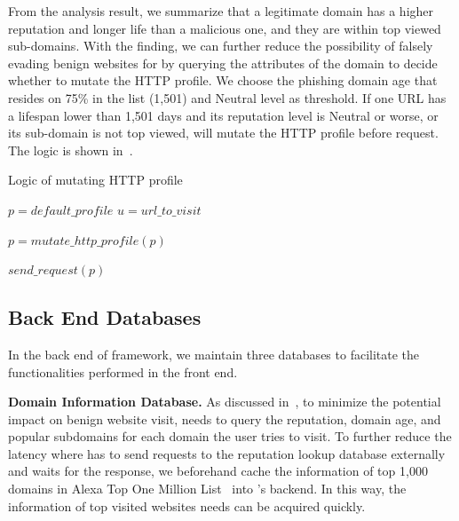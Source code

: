 From the analysis result, we summarize that a legitimate domain has a higher reputation and longer life than a malicious one, and they are within top viewed sub-domains.
With the finding, we can further reduce the possibility of falsely evading benign websites for \spartacus by querying the attributes of the domain to decide whether to mutate the HTTP profile.
We choose the phishing domain age that resides on 75\% in the list (1,501) and Neutral level as threshold.
If one URL has a lifespan lower than 1,501 days and its reputation level is Neutral or worse, or its sub-domain is not top viewed, \spartacus will mutate the HTTP profile before request.
The logic is shown in~.

\begin{algorithm}
  \caption{Logic of mutating HTTP profile}
\begin{algorithmic}[1]

\State $p = default\_profile$
\State $u = url\_to\_visit$

    \State $p = mutate\_http\_profile(p)$
\EndIf

\State $send\_request(p)$

\end{algorithmic}
\label{alg:mutatelogic}
\end{algorithm}



\subsection{Back End Databases}

In the back end of \spartacus framework, we maintain three databases to facilitate the functionalities performed in the front end.

\noindent
\textbf{Domain Information Database.}
As discussed in~, to minimize the potential impact on benign website visit,
\spartacus needs to query the reputation, domain age, and popular subdomains for each domain the user tries to visit.
To further reduce the latency where \spartacus has to send requests to the reputation lookup database externally and waits for the response,
we beforehand cache the information of top 1,000 domains in Alexa Top One Million List~\cite{AlexaTop1M} into \spartacus's backend.
In this way, the information of top visited websites \spartacus needs can be acquired quickly.


